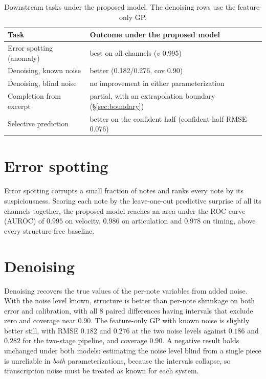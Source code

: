\documentclass[11pt,a4paper]{report}
\begin{document}
\begin{table}[h]\centering
\caption{Downstream tasks under the proposed model. The denoising rows use
the feature-only GP.}
\label{tab:downstream}
\footnotesize
\begin{tabular}{@{}p{4.6cm}p{8.2cm}@{}}
\toprule
Task & Outcome under the proposed model \\
\midrule
Error spotting (anomaly) & best on all channels ($v$ 0.995) \\
Denoising, known noise & better (0.182/0.276, cov 0.90) \\
Denoising, blind noise & no improvement in either parameterization \\
Completion from excerpt & partial, with an extrapolation boundary (\S\ref{sec:boundary}) \\
Selective prediction & better on the confident half (confident-half RMSE 0.076) \\
\bottomrule
\end{tabular}
\end{table}

\section{Error spotting}
Error spotting corrupts a small fraction of notes and ranks every note by
its suspiciousness. Scoring each note by the leave-one-out predictive
surprise of all its channels together, the proposed model reaches an area
under the ROC curve (AUROC) of $0.995$ on velocity,
$0.986$ on articulation and $0.978$ on timing, above every structure-free
baseline.

\section{Denoising}
Denoising recovers the true values of the per-note variables from added
noise. With the noise level known, structure is better than per-note
shrinkage on both error and calibration, with all 8 paired differences having
intervals that exclude zero and coverage near $0.90$. The feature-only GP
with known noise is slightly better still, with RMSE $0.182$ and $0.276$ at
the two noise levels against $0.186$ and $0.282$ for the two-stage pipeline,
and coverage $0.90$. A
negative result holds unchanged under both models: estimating the noise level
blind from a single piece is unreliable in \emph{both} parameterizations,
because the intervals collapse, so transcription noise must be treated as
known for each system.
\end{document}
